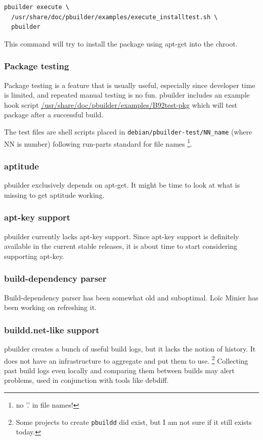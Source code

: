 \documentclass[a4paper]{article}
\begin{document}
\begin{verbatim}
pbuilder execute \
  /usr/share/doc/pbuilder/examples/execute_installtest.sh \
  pbuilder
\end{verbatim}

This command will try to install the package using apt-get into the
chroot.

\subsubsection{Package testing}

Package testing is a feature that is usually useful, especially since
developer time is limited, and repeated manual testing is no fun.
pbuilder includes an example hook script
\url{/usr/share/doc/pbuilder/examples/B92test-pkg} which will test
package after a successful build.

The test files are shell scripts placed in
\verb!debian/pbuilder-test/NN_name! (where NN is number) following
run-parts standard for file names \footnote{no '.' in file names!}.

\subsubsection{aptitude}

pbuilder exclusively depends on apt-get.  It might be time to look at
what is missing to get aptitude working.

\subsubsection{apt-key support}

pbuilder currently lacks apt-key support.  Since apt-key support is
definitely available in the current stable releases, it is about time to
start considering supporting apt-key.

\subsubsection{build-dependency parser}

Build-dependency parser has been somewhat old and suboptimal.  Lo\"ic
Minier has been working on refreshing it.

\subsubsection{buildd.net-like support}

pbuilder creates a bunch of useful build logs, but it lacks the notion
of history. It does not have an infrastructure to aggregate and put them
to use.  \footnote{Some projects to create \texttt{pbuildd} did exist,
but I am not sure if it still exists today.  } Collecting past build
logs even locally and comparing them between builds may alert problems,
used in conjunction with tools like debdiff.
\end{document}
